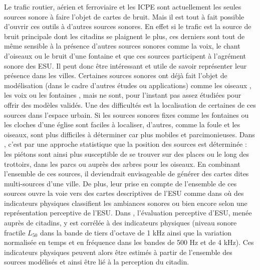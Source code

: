 Le trafic routier, aérien et ferroviaire et les ICPE sont actuellement les seules sources sonore à faire l'objet de cartes de bruit. Mais il est tout à fait possible d'ouvrir ces outils à d'autres sources sonores. 
En effet si le trafic est la source de bruit principale dont les citadins se plaignent le plus, ces derniers sont tout de même sensible à la présence d'autres sources sonores comme la voix, le chant d'oiseaux ou le bruit d'une fontaine et que ces sources participent à l'agrément sonore des ESU. Il peut donc être intéressant et utile de savoir représenter leur présence dans les villes. 
Certaines sources sonores ont déjà fait l'objet de modélisation (dans le cadre d'autres études ou applications) comme les oiseaux \cite{nemeth2013bird}, les voix \cite{hayne2011prediction} ou les fontaines \cite{watts2009measurement}, mais ne sont, pour l'instant pas assez étudiées pour offrir des modèles validés. 
Une des difficultés est la localisation de certaines de ces sources dans l'espace urbain. Si les sources sonores fixes comme les fontaines ou les cloches d'une église sont faciles à localiser, d'autres, comme la foule et les oiseaux, sont plus difficiles à déterminer car plus mobiles et parcimonieuses. Dans \cite{aumond2018probabilistic}, c'est par une approche statistique que la position des sources est déterminée : les piétons sont ainsi plus susceptible de se trouver sur des places ou le long des trottoirs, dans les parcs ou auprès des arbres pour les oiseaux. En combinant l'ensemble de ces sources, il deviendrait envisageable de générer des cartes dites multi-sources d'une ville. 
De plus, leur prise en compte de l'ensemble de ces sources ouvre la voie vers des cartes descriptives de l'ESU comme dans \cite{can_describing_2015} où des indicateurs physiques classifient les ambiances sonores ou bien encore selon une représentation perceptive de l'ESU. Dans \cite{aumond2017modeling}, l'évaluation perceptive d'ESU, menée auprès de citadins, y est corrélée à des indicateurs physiques (niveau sonore fractile $L_{50}$ dans la bande de tiers d'octave de 1 kHz ainsi que la variation normalisée en temps et en fréquence dans les bandes de 500 Hz et de 4 kHz). Ces indicateurs physiques peuvent alors être estimés à partir de l'ensemble des sources modélisés et ainsi être lié à la perception du citadin.


